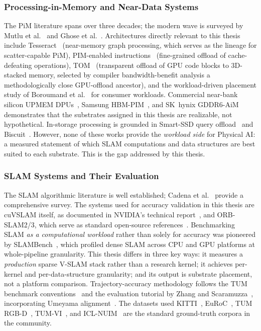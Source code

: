 \subsubsection{Processing-in-Memory and Near-Data Systems}

The PiM literature spans over three decades; the modern wave is surveyed by Mutlu et al.~\cite{mutlu2019pim} and Ghose et al.~\cite{ghose2019pim}. Architectures directly relevant to this thesis include Tesseract~\cite{ahn2015tesseract} (near-memory graph processing, which serves as the lineage for scatter-capable PiM), PIM-enabled instructions~\cite{ahn2015pei} (fine-grained offload of cache-defeating operations), TOM~\cite{hsieh2016tom} (transparent offload of GPU code blocks to 3D-stacked memory, selected by compiler bandwidth-benefit analysis a methodologically close GPU-offload ancestor), and the workload-driven placement study of Boroumand et al.~\cite{boroumand2018google} for consumer workloads. Commercial near-bank silicon UPMEM DPUs~\cite{gomezluna2021upmem}, Samsung HBM-PIM~\cite{kwon2021hbmpim}, and SK~hynix GDDR6-AiM~\cite{lee2022aim} demonstrates that the substrates assigned in this thesis are realizable, not hypothetical. In-storage processing is grounded in Smart-SSD query offload~\cite{do2013smartssd} and Biscuit~\cite{gu2016biscuit}. However, none of these works provide the \emph{workload side} for Physical AI: a measured statement of which SLAM computations and data structures are best suited to each substrate. This is the gap addressed by this thesis.

\subsubsection{SLAM Systems and Their Evaluation}

The SLAM algorithmic literature is well established; Cadena et al.~\cite{cadena2016slam} provide a comprehensive survey. The systems used for accuracy validation in this thesis are cuVSLAM itself, as documented in NVIDIA's technical report~\cite{cuvslam2025}, and ORB-SLAM2/3, which serve as standard open-source references~\cite{murartal2017orbslam2,campos2021orbslam3}. Benchmarking SLAM \emph{as a computational workload} rather than solely for accuracy was pioneered by SLAMBench~\cite{nardi2015slambench}, which profiled dense SLAM across CPU and GPU platforms at whole-pipeline granularity. This thesis differs in three key ways: it measures a \emph{production} sparse V-SLAM stack rather than a research kernel; it achieves per-kernel and per-data-structure granularity; and its output is substrate placement, not a platform comparison. Trajectory-accuracy methodology follows the TUM benchmark conventions~\cite{sturm2012tum} and the evaluation tutorial by Zhang and Scaramuzza~\cite{zhang2018tutorial}, incorporating Umeyama alignment~\cite{umeyama1991}. The datasets used KITTI~\cite{geiger2013kitti}, EuRoC~\cite{burri2016euroc}, TUM RGB-D~\cite{sturm2012tum}, TUM-VI~\cite{schubert2018tumvi}, and ICL-NUIM~\cite{handa2014iclnuim} are the standard ground-truth corpora in the community.

